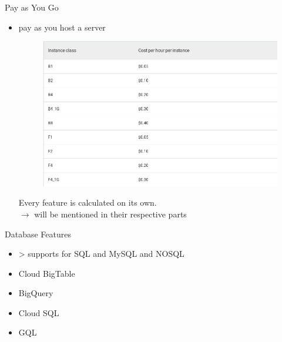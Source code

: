 \documentclass{beamer}
\begin{document}
\begin{frame}
	
\end{frame}
\begin{frame}{Pay as You Go}
	\begin{itemize}
		\item pay as you host a server
	\begin{figure}
		\centering
		\includegraphics[width=0.7\linewidth]{"Screenshot from 2019-11-30 17-46-06"}
		\caption{}
		\label{fig:screenshot-from-2019-11-30-17-46-06}
		
	\end{figure}
Every feature is calculated on its own. \\
$\rightarrow$ will be mentioned in their respective parts
	
	\end{itemize}
	
\end{frame}
\begin{frame}{Database Features}
			\begin{itemize}
	\item  > supports for SQL and MySQL and NOSQL
	\item Cloud BigTable
\item BigQuery
\item Cloud SQL
\item GQL

	\end{itemize}
\end{frame}
\end{document}
